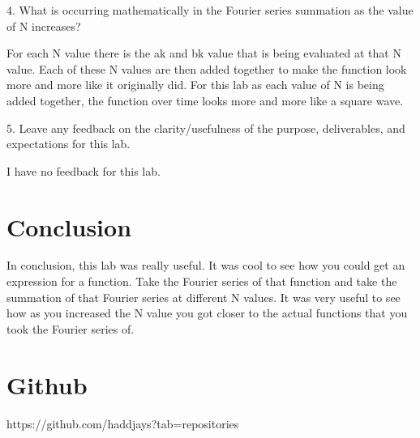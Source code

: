 \documentclass[11pt,a4]{report}
\begin{document}
4. What is occurring mathematically in the Fourier series summation as the value of N increases?

For each N value there is the ak and bk value that is being evaluated at that N value. Each of these N values are then added together to make the function look more and more like it originally did. For this lab as each value of N is being added together, the function over time looks more and more like a square wave. 

5. Leave any feedback on the clarity/usefulness of the purpose, deliverables, and expectations
for this lab.

I have no feedback for this lab. 

\section{Conclusion}
In conclusion, this lab was really useful. It was cool to see how you could get an expression for a function. Take the Fourier series of that function and take the summation of that Fourier series at different N values. It was very useful to see how as you increased the N value you got closer to the actual functions that you took the Fourier series of. 


\section{Github}
https://github.com/haddjays?tab=repositories
\end{document}
